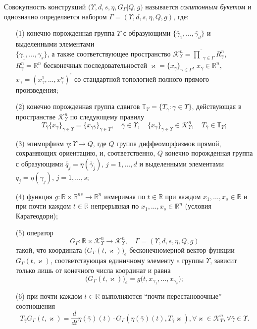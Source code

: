 Совокупность конструкций $\big(\Upsilon,d,s,\eta,G_\Gamma|Q,g\big)$ называется {\it солитонным букетом} и однозначно определяется набором $\Gamma=(\Upsilon,d,s,\eta,Q,g)$, где:
\begin{itemize}
\item[(1)] конечно порожденная группа $\Upsilon$ с образующими $\{\check{\gamma_1},\ldots,\check{\gamma_d}\}$ и выделенными элементами\\ $\{\gamma_1,\ldots,\gamma_s\}$, а также соответствующее пространство $\mathcal K^n_\Upsilon=\overline{\prod}_{\gamma\in \Gamma} R^n_\gamma$, $R^n_\gamma=\mathbb R^n$ бесконечных последовательностей $\varkappa=\{x_\gamma\}_{\gamma\in \Gamma}$, $x_\gamma\in \mathbb R^n$, $x_\gamma=(x_\gamma^1,\ldots, x_\gamma^n)^{'}$ со стандартной топологией полного прямого произведения;
\item[(2)] конечно порожденная группа сдвигов $\mathbb T_\Upsilon=\{T_\gamma: \gamma \in \Upsilon\}$, действующая в пространстве $\mathcal K^n_\Upsilon$ по следующему правилу
    $$
    T_{\bar{\gamma}}\{x_\gamma\}_{\gamma \in \Upsilon }=\{x_{\gamma\bar{\gamma}}\}_{\gamma \in \Upsilon},\quad \bar{\gamma}\in \Upsilon,\quad \{x_\gamma\}_{\gamma \in \Upsilon }\in \mathcal K^n_\Upsilon,\quad T_{\bar{\gamma}} \in \mathbb T_\Upsilon;
    $$
\item[(3)] эпиморфизм $\eta: \Upsilon \rightarrow Q$, где $Q$ группа диффеоморфизмов прямой, сохраняющих ориентацию, и, соответственно, $Q$ конечно порожденная группа с образующими $\check{q_j}=\eta(\check{\gamma_j})$, $j=1,\ldots,d$ и выделенными элементами $q_j=\eta({\gamma_j})$, $j=1,\ldots,s$;
\item[(4)] функция $g:\mathbb R\times \mathbb R^{ns} \rightarrow \mathbb R^{n}$ измеримая по $t\in \mathbb R$ при каждом $x_1,\ldots,x_s\in \mathbb R$ и при почти каждом $t\in \mathbb R$ непрерывная по $x_1,\ldots,x_s\in \mathbb R^n$ (условия Каратеодори);
\item[(5)] оператор
$$
G_{\Gamma}: \mathbb R\times \mathcal K^n_\Upsilon \rightarrow \mathcal K^n_\Upsilon,\quad \Gamma=(\Upsilon,d,s,\eta,Q,g)
$$
такой, что координата $\big(G_{\Gamma}(t,\varkappa)\big)_e$ бесконечномерной вектор-функции $G_{\Gamma}(t,\varkappa)$, соответствующая единичному элементу $e$ группы $\Upsilon$, зависит только лишь от конечного числа координат и равна
$$
\big(G_{\Gamma}(t,\varkappa)\big)_e=g\big(t,x_{{\gamma}_1},\ldots,x_{{\gamma}_s}\big);
$$
\item[(6)] при почти каждом $t \in \mathbb R $ выполняются ``почти перестановочные'' соотношения
$$
T_{\bar\gamma} G_{\Gamma}(t,\varkappa)=\frac{d}{dt}\eta(\bar\gamma)(t)\cdot G_{\Gamma}(\eta(\bar\gamma)(t),T_{\bar\gamma}\varkappa), \forall \varkappa \in \mathcal  K^n_\Upsilon, \forall \bar\gamma\in \Upsilon.
$$
\end{itemize}

